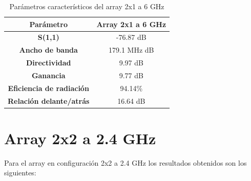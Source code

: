 \begin{table}[H]
  
   
   \small %
   \centering %
   \begin{tabular}{c c} %
   \toprule[\heavyrulewidth]\toprule[\heavyrulewidth]
   \textbf{Parámetro} & \textbf{Array 2x1 a 6 GHz} \\ 
   \midrule
   \textbf{S(1,1)} & -76.87 dB \\
   \textbf{Ancho de banda} & 179.1 MHz dB \\
   \textbf{Directividad} & 9.97 dB \\
   \textbf{Ganancia} & 9.77 dB \\
   \textbf{Eficiencia de radiación} & 94.14\% \\
   \textbf{Relación delante/atrás} & 16.64 dB \\

   \bottomrule[\heavyrulewidth] 
   \end{tabular}
   
   \caption{Parámetros característicos del array 2x1 a 6 GHz} 
   \label{tab:res2x12}
\end{table}


















\section{Array 2x2 a 2.4 GHz}
\par Para el array en configuración 2x2 a 2.4 GHz los resultados obtenidos son los siguientes:

